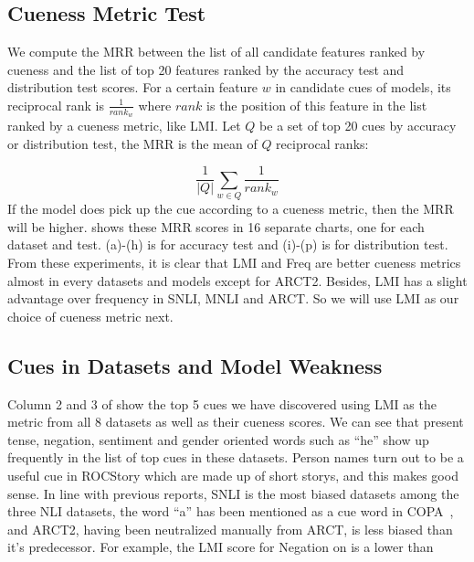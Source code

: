 \subsection{Cueness Metric Test}
We compute the MRR between the list of all candidate features ranked 
by cueness and the list of
top 20 features ranked by the accuracy test and distribution test scores. 
For a certain feature $w$ in candidate cues of models,  its reciprocal rank is $\frac{1}{rank_w}$ 
where $rank$ is the position of this feature in the list ranked by a cueness metric, like LMI.
Let $Q$ be a set of top 20 cues by accuracy or distribution test, the MRR is the mean of $Q$ reciprocal ranks:

\begin{equation}
\frac{1}{|Q|}\sum_{w \in Q}\frac{1}{rank_{w}}
\end{equation}
If the model does pick up the cue according to a cueness metric, 
then the MRR will be higher.
 shows these MRR scores in 16 separate charts, 
one for each dataset and test. (a)-(h) is for accuracy test and (i)-(p) is for distribution test. 
From these experiments, it is clear that
LMI and Freq are better cueness metrics almost in every datasets and models except for ARCT2. 
Besides, LMI has a slight advantage over
frequency in SNLI, MNLI and ARCT. So we will use LMI as our choice of
cueness metric next.


\subsection{Cues in Datasets and Model Weakness}

Column 2 and 3 of  show the top 5 cues we have discovered
using LMI as the metric from all 8 datasets as well as their cueness scores.
We can see that present tense, negation, sentiment and gender oriented words such as
``he'' show up frequently in the list of top cues in these datasets. 
Person names turn out to be a useful cue in ROCStory which are made up of
short storys, and this makes good sense.
In line with previous reports, SNLI is the most biased datasets among the three
NLI datasets, the word ``a'' has been mentioned as a cue word in COPA~\cite{kavumbabalanced-copa}, and ARCT2, having been neutralized manually from ARCT, is less
biased than it's predecessor. For example, the LMI score for Negation on is a lower than 


